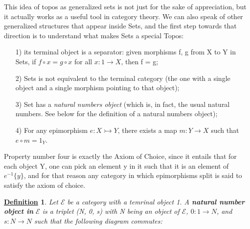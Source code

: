 \documentclass{article}
\newtheorem*{def*}{\underline{Definition}}
\begin{document}
This idea of topos as generalized sets is not just for the sake of appreciation, but it actually works as a useful tool in category theory. We can also speak of other generalized structures that appear inside Sets, and the first step towards that direction is to understand what makes Sets a special Topos:
\begin{itemize}
	\item[1)] its terminal object is a separator: given morphisms f, g from X to Y in Sets, if \(f\circ x = g\circ x\) for all \(x:1\rightarrow X\), then f = g;
	\item[2)] Sets is not equivalent to the terminal category (the one with a single object and a single morphism pointing to that object);
	\item[3)] Set has a \textit{natural numbers object} (which is, in fact, the usual natural numbers. See below for the definition of a natural numbers object);
	\item[4)] For any epimorphism \(e:X\rightarrowtail  Y\), there exists a map \(m:Y\rightarrow X\) such that \(e\circ m = 1_{Y}\).
\end{itemize}
Property number four is exactly the Axiom of Choice, since it entails that for each object Y, one can pick an element y in it such that it is an element of \(e^{-1}\{y\}\), and for that reason any category in which epimorphisms split is said to satisfy the axiom of choice.

\begin{def*}
	Let \(\mathcal{E}\) be a category with a temrinal object 1. A \textbf{natural number object in }\(\mathcal{E}\) is a triplet (N, 0, s) with N being an object of \(\mathcal{E}\), \(0:1\rightarrow N\), and \(s:N\rightarrow N\) such that the following diagram commutes:
	\begin{center}
	\end{center}
\end{def*}
\end{document}
